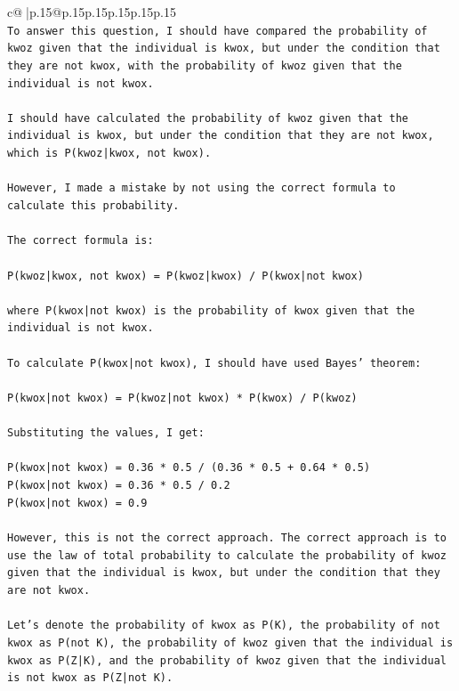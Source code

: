 \documentclass{article}
\begin{document}
{\begin{supertabular}{c@{$\;$}|p{.15\linewidth}@{}p{.15\linewidth}p{.15\linewidth}p{.15\linewidth}p{.15\linewidth}p{.15\linewidth}}
{{{\\ 
\texttt{To answer this question, I should have compared the probability of kwoz given that the individual is kwox, but under the condition that they are not kwox, with the probability of kwoz given that the individual is not kwox. } \\
\\ 
\texttt{I should have calculated the probability of kwoz given that the individual is kwox, but under the condition that they are not kwox, which is P(kwoz|kwox, not kwox). } \\
\\ 
\texttt{However, I made a mistake by not using the correct formula to calculate this probability. } \\
\\ 
\texttt{The correct formula is:} \\
\\ 
\texttt{P(kwoz|kwox, not kwox) = P(kwoz|kwox) / P(kwox|not kwox)} \\
\\ 
\texttt{where P(kwox|not kwox) is the probability of kwox given that the individual is not kwox.} \\
\\ 
\texttt{To calculate P(kwox|not kwox), I should have used Bayes' theorem:} \\
\\ 
\texttt{P(kwox|not kwox) = P(kwoz|not kwox) * P(kwox) / P(kwoz)} \\
\\ 
\texttt{Substituting the values, I get:} \\
\\ 
\texttt{P(kwox|not kwox) = 0.36 * 0.5 / (0.36 * 0.5 + 0.64 * 0.5)} \\
\texttt{P(kwox|not kwox) = 0.36 * 0.5 / 0.2} \\
\texttt{P(kwox|not kwox) = 0.9} \\
\\ 
\texttt{However, this is not the correct approach. The correct approach is to use the law of total probability to calculate the probability of kwoz given that the individual is kwox, but under the condition that they are not kwox.} \\
\\ 
\texttt{Let's denote the probability of kwox as P(K), the probability of not kwox as P(not K), the probability of kwoz given that the individual is kwox as P(Z|K), and the probability of kwoz given that the individual is not kwox as P(Z|not K).} \\
}}}
\end{supertabular}}
\end{document}
